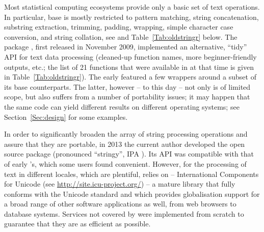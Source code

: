 \documentclass[nojss]{jss}
\begin{document}
\bigskip
Most statistical computing ecosystems provide only a basic set of text
operations. In particular, base  \citep{Rproject:home}
is mostly restricted to pattern matching, string concatenation,
substring extraction, trimming, padding, wrapping,
simple character case conversion, and string collation,
see \citep[Chapter~8]{Chambers2008:SoftDA} and Table~\ref{Tab:oldstringr} below.
The  package \citep{Wickham2010:stringr},
first released in November 2009, implemented an alternative, ``tidy''
API for text data processing (cleaned-up function names,
more beginner-friendly outputs, etc.;
the list of 21 functions that were available in  at that
time is given in Table~\ref{Tab:oldstringr}).
The early  featured a few wrappers around
a subset of its base  counterparts. The latter,
however -- to this day -- not only is of limited scope,
but also suffers from a number of portability issues; it may happen that
the same code can yield different results on different operating systems;
see Section~\ref{Sec:design} for some examples.



In order to significantly broaden the array of string processing
operations and assure that they are portable, in 2013 the current
author developed the open source  package
(pronounced ``stringy'', IPA \textipa{[{stringi}]}).
Its API was compatible with that of early 's,
which some users found convenient. However, for the processing of text
in different locales, which are plentiful,  relies
on  -- International Components for Unicode
(see \url{http://site.icu-project.org/}) -- a mature library that
fully conforms with the Unicode standard and which provides globalisation
support for a broad range of other software applications as well, from
web browsers to database systems. Services not covered by 
were implemented from scratch to guarantee that they are as efficient
as possible.
\end{document}
